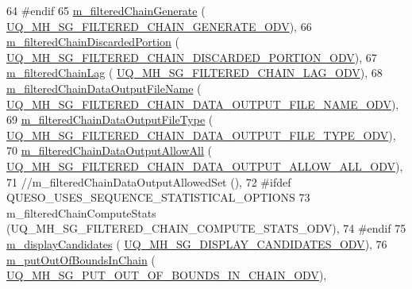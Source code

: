 \begin{DoxyCode}
64 \textcolor{preprocessor}{#endif}
65 \textcolor{preprocessor}{}  \hyperlink{class_q_u_e_s_o_1_1_mh_options_values_afe02816132a862e807ea3675b4125ccb}{m\_filteredChainGenerate}                    (
      \hyperlink{_metropolis_hastings_s_g_options_8h_a5d849c1d612df021c7572c8f64e66c68}{UQ\_MH\_SG\_FILTERED\_CHAIN\_GENERATE\_ODV}),
66   \hyperlink{class_q_u_e_s_o_1_1_mh_options_values_afdaa37947c3a5c5acc11b89fa0a98fb9}{m\_filteredChainDiscardedPortion}            (
      \hyperlink{_metropolis_hastings_s_g_options_8h_abac2ddea2dbed40cc772ee1dce223a5f}{UQ\_MH\_SG\_FILTERED\_CHAIN\_DISCARDED\_PORTION\_ODV}),
67   \hyperlink{class_q_u_e_s_o_1_1_mh_options_values_abd87b32b15f3ce695d910b48d837094f}{m\_filteredChainLag}                         (
      \hyperlink{_metropolis_hastings_s_g_options_8h_a4f771b9dc2dab1a0761823c33d957f76}{UQ\_MH\_SG\_FILTERED\_CHAIN\_LAG\_ODV}),
68   \hyperlink{class_q_u_e_s_o_1_1_mh_options_values_a337b2f1161814f1c52153cbe7706f59a}{m\_filteredChainDataOutputFileName}          (
      \hyperlink{_metropolis_hastings_s_g_options_8h_a6617ee84d21f7980e0e4095e7d3c2d62}{UQ\_MH\_SG\_FILTERED\_CHAIN\_DATA\_OUTPUT\_FILE\_NAME\_ODV}),
69   \hyperlink{class_q_u_e_s_o_1_1_mh_options_values_adc3052dc0f1c2fd5072cb415a0eb3265}{m\_filteredChainDataOutputFileType}          (
      \hyperlink{_metropolis_hastings_s_g_options_8h_abae51077aec9f525f73d985d3b3e6c27}{UQ\_MH\_SG\_FILTERED\_CHAIN\_DATA\_OUTPUT\_FILE\_TYPE\_ODV}),
70   \hyperlink{class_q_u_e_s_o_1_1_mh_options_values_a249e8720b4570d5f4e6504a29a84ac04}{m\_filteredChainDataOutputAllowAll}          (
      \hyperlink{_metropolis_hastings_s_g_options_8h_ab91fb04bffb37db43431881b6fdcd33b}{UQ\_MH\_SG\_FILTERED\_CHAIN\_DATA\_OUTPUT\_ALLOW\_ALL\_ODV}),
71 \textcolor{comment}{//m\_filteredChainDataOutputAllowedSet        (),}
72 \textcolor{preprocessor}{#ifdef QUESO\_USES\_SEQUENCE\_STATISTICAL\_OPTIONS}
73 \textcolor{preprocessor}{}  m\_filteredChainComputeStats                (UQ\_MH\_SG\_FILTERED\_CHAIN\_COMPUTE\_STATS\_ODV),
74 \textcolor{preprocessor}{#endif}
75 \textcolor{preprocessor}{}  \hyperlink{class_q_u_e_s_o_1_1_mh_options_values_a1df386cecfd87745e4d8adfb472d3443}{m\_displayCandidates}                        (
      \hyperlink{_metropolis_hastings_s_g_options_8h_afd9de97e637ad6bce8c4829f3c9567e9}{UQ\_MH\_SG\_DISPLAY\_CANDIDATES\_ODV}),
76   \hyperlink{class_q_u_e_s_o_1_1_mh_options_values_a6500d388ce724964ed858174a454177a}{m\_putOutOfBoundsInChain}                    (
      \hyperlink{_metropolis_hastings_s_g_options_8h_acfa03e1487c443ca6e3cb2f1edee5c5e}{UQ\_MH\_SG\_PUT\_OUT\_OF\_BOUNDS\_IN\_CHAIN\_ODV}),

\end{DoxyCode}
